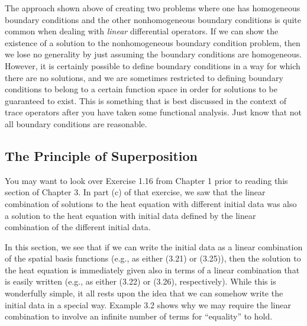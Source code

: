 \documentclass{amsart}
\theoremstyle{plain}
\theoremstyle{definition}
\theoremstyle{remark}
\theoremstyle{definition}
\numberwithin{equation}{section}
\numberwithin{equation}{section}
\begin{document}
The approach shown above of creating two problems where one has homogeneous boundary conditions and the other nonhomogeneous boundary conditions is quite common when dealing with {\em linear} differential operators. 
If we can show the existence of a solution to the nonhomogeneous boundary condition problem, then we lose no generality by just assuming the boundary conditions are homogeneous.
However, it is certainly possible to define boundary conditions in a way for which there are no solutions, and we are sometimes restricted to defining boundary conditions to belong to a certain function space in order for solutions to be guaranteed to exist. 
This is something that is best discussed in the context of trace operators after you have taken some functional analysis. 
Just know that not all boundary conditions are reasonable.

\subsection{The Principle of Superposition}

You may want to look over Exercise 1.16 from Chapter 1 prior to reading this section of Chapter 3.
In part (c) of that exercise, we saw that the linear combination of solutions to the heat equation with different initial data was also a solution to the heat equation with initial data defined by the linear combination of the different initial data. 

In this section, we see that if we can write the initial data as a linear combination of the spatial basis functions (e.g., as either (3.21) or (3.25)), then the solution to the heat equation is immediately given also in terms of a linear combination that is easily written (e.g., as either (3.22) or (3.26), respectively). 
While this is wonderfully simple, it all rests upon the idea that we can somehow write the initial data in a special way.
Example 3.2 shows why we may require the linear combination to involve an infinite number of terms for ``equality'' to hold.
\end{document}
